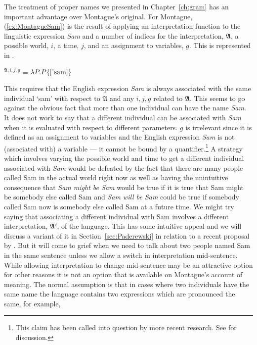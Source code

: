 The treatment of proper names we presented in Chapter~\ref{ch:gram}
has an important advantage over
Montague's original.  For Montague, (\ref{ex:MontagueSam}) is the
result of applying an interpretation function to the linguistic
expression \textit{Sam} and a number of indices for the
interpretation, $\mathfrak{A}$, a possible world, $i$, a time, $j$,
and an assignment to variables, $g$.  This is represented in
\nexteg{}.
\begin{ex} 
$^{\mathfrak{A},i,j,g}$ = $\lambda P.P\{[\,\hat{}\,\mathrm{sam}]\}$ 
\end{ex} 
This requires that the English expression \textit{Sam} is always
associated with the same individual `sam' with respect to
$\mathfrak{A}$ and any $i,j,g$ related to $\mathfrak{A}$.  This seems to go against the obvious fact that
more than one individual can have the name \textit{Sam}.  It does not
work to say that a different individual can be associated with
\textit{Sam} when it is evaluated with respect to different
parameters.  $g$ is irrelevant since it is defined as an assignment to
variables and the English expression \textit{Sam} is not (associated
with) a variable --- it cannot be bound by a quantifier.\footnote{This
  claim has been called into question by more recent research.  See
  \cite{Maier2009} for discussion.}  A strategy
which involves varying the
possible world and time to get a different individual associated with
\textit{Sam} would be defeated by the fact that there are many people
called Sam in the actual world right now as well as having the
unintuitive consequence that \textit{Sam might be Sam} would be true if it is true
that Sam might be somebody else called Sam and \textit{Sam will be
  Sam} could be true if somebody called Sam now is somebody else
called Sam at a future time.  We might try saying that associating a
different individual with Sam involves a different interpretation,
$\mathfrak{A}'$, of the language.  This has some intuitive appeal and
we will discuss a variant of it in Section~\ref{sec:Paderewski} in
relation to a recent proposal by \cite{Ludlow2014}. But
it will come to grief when we need to talk about two people named Sam
in the same sentence unless we allow a switch in interpretation
mid-sentence.  While allowing interpretation to change mid-sentence
may be an attractive option for other reasons it is not an option that
is available on Montague's account of meaning.  The normal assumption
is that in cases where two individuals have the same name the language
contains two expressions which are pronounced the same, for example,

